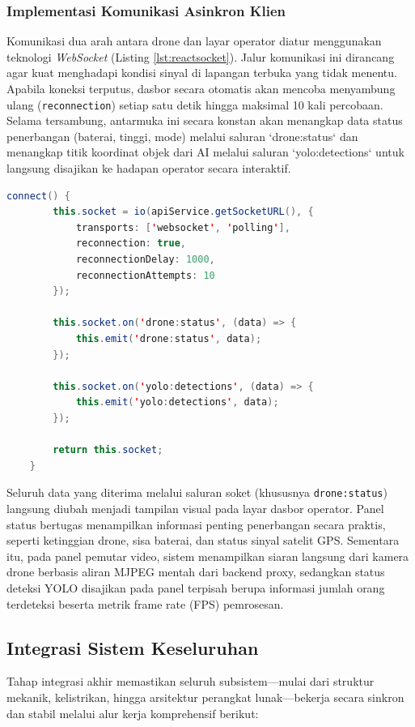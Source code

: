 \subsubsection{Implementasi Komunikasi Asinkron Klien}
Komunikasi dua arah antara drone dan layar operator diatur menggunakan teknologi \textit{WebSocket} (Listing \ref{lst:reactsocket}). Jalur komunikasi ini dirancang agar kuat menghadapi kondisi sinyal di lapangan terbuka yang tidak menentu. Apabila koneksi terputus, dasbor secara otomatis akan mencoba menyambung ulang (\texttt{reconnection}) setiap satu detik hingga maksimal 10 kali percobaan. Selama tersambung, antarmuka ini secara konstan akan menangkap data status penerbangan (baterai, tinggi, mode) melalui saluran `drone:status` dan menangkap titik koordinat objek dari AI melalui saluran `yolo:detections` untuk langsung disajikan ke hadapan operator secara interaktif.

\begin{lstlisting}[language=Java, caption={Modul \textit{service} komunikasi \textit{socket} untuk penerimaan siaran telemetri}, label={lst:reactsocket}]
	connect() {
		this.socket = io(apiService.getSocketURL(), {
			transports: ['websocket', 'polling'],
			reconnection: true,
			reconnectionDelay: 1000,
			reconnectionAttempts: 10
		});
		
		this.socket.on('drone:status', (data) => {
			this.emit('drone:status', data);
		});
		
		this.socket.on('yolo:detections', (data) => {
			this.emit('yolo:detections', data);
		});
		
		return this.socket;
	}
\end{lstlisting}
Seluruh data yang diterima melalui saluran soket (khususnya \texttt{drone:status}) langsung diubah menjadi tampilan visual pada layar dasbor operator. Panel status bertugas menampilkan informasi penting penerbangan secara praktis, seperti ketinggian drone, sisa baterai, dan status sinyal satelit GPS. Sementara itu, pada panel pemutar video, sistem menampilkan siaran langsung dari kamera drone berbasis aliran MJPEG mentah dari backend proxy, sedangkan status deteksi YOLO disajikan pada panel terpisah berupa informasi jumlah orang terdeteksi beserta metrik frame rate (FPS) pemrosesan.
\subsection{Integrasi Sistem Keseluruhan}

Tahap integrasi akhir memastikan seluruh subsistem—mulai dari struktur mekanik, kelistrikan, hingga arsitektur perangkat lunak—bekerja secara sinkron dan stabil melalui alur kerja komprehensif berikut:

